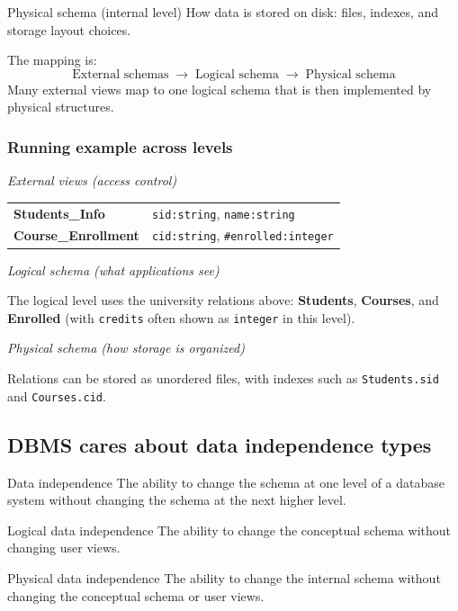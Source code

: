 \documentclass[../../dis.tex]{subfiles}
\begin{document}
\begin{concept}{Physical schema (internal level)}
How data is stored on disk: files, indexes, and storage layout choices.
\end{concept}

The mapping is:
\[
\text{External schemas} \;\rightarrow\; \text{Logical schema} \;\rightarrow\; \text{Physical schema}
\]
Many external views map to one logical schema that is then implemented by physical structures.

\subsubsection*{Running example across levels}
\textit{External views (access control)}

\begin{tabularx}{\textwidth}{@{}lX@{}}
\textbf{Students\_Info} & \texttt{sid:string}, \texttt{name:string} \\
\textbf{Course\_Enrollment} & \texttt{cid:string}, \texttt{\#enrolled:integer} \\
\end{tabularx}

\textit{Logical schema (what applications see)}

The logical level uses the university relations above:
\textbf{Students}, \textbf{Courses}, and \textbf{Enrolled}
(with \texttt{credits} often shown as \texttt{integer} in this level).

\textit{Physical schema (how storage is organized)}

Relations can be stored as unordered files, with indexes such as \texttt{Students.sid} and \texttt{Courses.cid}.

\subsection{DBMS cares about data independence types}
\begin{concept}{Data independence}
The ability to change the schema at one level of a database system without changing the schema at the next higher level.
\end{concept}

\begin{concept}{Logical data independence}
The ability to change the conceptual schema without changing user views.
\end{concept}

\begin{concept}{Physical data independence}
The ability to change the internal schema without changing the conceptual schema or user views.
\end{concept}
\end{document}
